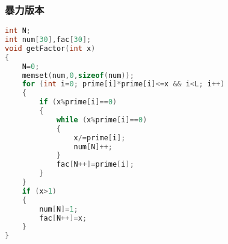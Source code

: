 	\subsubsection{暴力版本}
	\begin{lstlisting}[language=c++]
int N;
int num[30],fac[30];
void getFactor(int x)
{
	N=0;
	memset(num,0,sizeof(num));
	for (int i=0; prime[i]*prime[i]<=x && i<L; i++)
	{
		if (x%prime[i]==0)
		{
			while (x%prime[i]==0)
			{
				x/=prime[i];
				num[N]++;
			}
			fac[N++]=prime[i];
		}
	}
	if (x>1)
	{
		num[N]=1;
		fac[N++]=x;
	}
}
	\end{lstlisting}